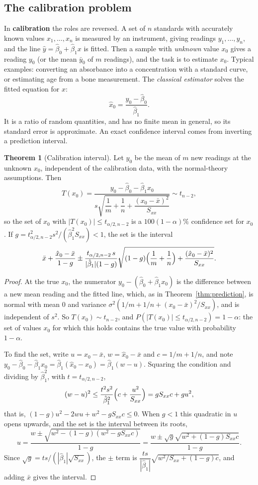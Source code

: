 \documentclass[11pt,a4paper]{article}
\numberwithin{equation}{section}
\theoremstyle{definition}
\newtheorem{thm}{Theorem}[subsection]
\begin{document}
\subsection{The calibration problem}
In \textbf{calibration} the roles are reversed. A set of $n$ standards with accurately known values $x_1, \dots, x_n$ is
measured by an instrument, giving readings $y_1, \dots, y_n$, and the line $\hat y = \hat\beta_0 + \hat\beta_1x$ is fitted. Then a sample with
\emph{unknown} value $x_0$ gives a reading $y_0$ (or the mean $\bar y_0$ of $m$ readings), and the task is to estimate $x_0$. Typical
examples: converting an absorbance into a concentration with a standard curve, or estimating age from a bone
measurement. The \emph{classical estimator} solves the fitted equation for $x$:
\[
\hat x_0 = \frac{y_0 - \hat\beta_0}{\hat\beta_1} .
\]
It is a ratio of random quantities, and has no finite mean in general, so its standard error is approximate. An
exact confidence interval comes from inverting a prediction interval.

\begin{thm}[Calibration interval]\label{thm:calibration}
Let $y_0$ be the mean of $m$ new readings at the unknown $x_0$, independent of the calibration data, with the
normal-theory assumptions. Then
\[
T(x_0) = \frac{y_0 - \hat\beta_0 - \hat\beta_1x_0}{s\sqrt{\dfrac1m + \dfrac1n + \dfrac{(x_0 - \bar x)^2}{S_{xx}}}} \sim t_{n-2} ,
\]
so the set of $x_0$ with $|T(x_0)| \le t_{\alpha/2,n-2}$ is a $100(1 - \alpha)\%$ confidence set for $x_0$. If
$g = t_{\alpha/2,n-2}^2s^2/(\hat\beta_1^2S_{xx}) < 1$, the set is the interval
\[
\bar x + \frac{\hat x_0 - \bar x}{1 - g} \pm \frac{t_{\alpha/2,n-2}\,s}{|\hat\beta_1|(1 - g)}\sqrt{(1 - g)\Bigl(\frac1m + \frac1n\Bigr) + \frac{(\hat x_0 - \bar x)^2}{S_{xx}}} .
\]
\end{thm}

\begin{proof}
At the true $x_0$, the numerator $y_0 - (\hat\beta_0 + \hat\beta_1x_0)$ is the difference between a new mean reading and the fitted line,
which, as in Theorem~\ref{thm:prediction}, is normal with mean $0$ and variance $\sigma^2(1/m + 1/n + (x_0 - \bar x)^2/S_{xx})$, and is independent
of $s^2$. So $T(x_0) \sim t_{n-2}$, and $P(|T(x_0)| \le t_{\alpha/2,n-2}) = 1 - \alpha$: the set of values $x_0$ for which this holds contains the true
value with probability $1 - \alpha$.

To find the set, write $u = x_0 - \bar x$, $w = \hat x_0 - \bar x$ and $c = 1/m + 1/n$, and note $y_0 - \hat\beta_0 - \hat\beta_1x_0 = \hat\beta_1(\hat x_0 - x_0) = \hat\beta_1(w - u)$.
Squaring the condition and dividing by $\hat\beta_1^2$, with $t = t_{\alpha/2,n-2}$,
\[
(w - u)^2 \le \frac{t^2s^2}{\hat\beta_1^2}\Bigl(c + \frac{u^2}{S_{xx}}\Bigr) = gS_{xx}c + gu^2 ,
\]
that is, $(1 - g)u^2 - 2wu + w^2 - gS_{xx}c \le 0$. When $g < 1$ this quadratic in $u$ opens upwards, and the set is the interval
between its roots,
\[
u = \frac{w \pm \sqrt{w^2 - (1 - g)(w^2 - gS_{xx}c)}}{1 - g} = \frac{w \pm \sqrt{g}\sqrt{w^2 + (1 - g)S_{xx}c}}{1 - g} .
\]
Since $\sqrt g = ts/(|\hat\beta_1|\sqrt{S_{xx}})$, the $\pm$ term is $\dfrac{ts}{|\hat\beta_1|}\sqrt{w^2/S_{xx} + (1 - g)c}$, and adding $\bar x$ gives the interval.
\end{proof}
\end{document}
